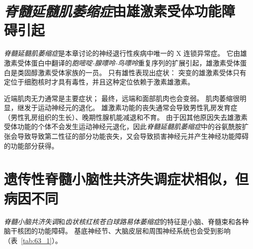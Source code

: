 \section{\textit{脊髓延髓肌萎缩症}由雄激素受体功能障碍引起}

\textit{脊髓延髓肌萎缩症}是本章讨论的神经退行性疾病中唯一的 X 连锁异常症。
它由雄激素受体蛋白中翻译的\textit{胞嘧啶-腺嘌呤-鸟嘌呤}重复序列的扩展引起，雄激素受体蛋白是类固醇激素受体家族的一员。
只有雄性表现出症状：
突变的雄激素受体只有定位于细胞核时才具有毒性，并且这种定位依赖于激素雄激素。


近端肌肉无力通常是主要症状；
最终，远端和面部肌肉也会变弱。
肌肉萎缩很明显，继发于运动神经元的退化。
雄激素功能的丧失通常会导致男性乳房发育症（男性乳房组织的生长）、晚期性腺机能减退和不育。
由于因其他原因失去雄激素受体功能的个体不会发生运动神经元退化，因此\textit{脊髓延髓肌萎缩症}中的谷氨酰胺扩张会导致导致第二性征的部分功能丧失，又会导致损害神经元并产生神经功能障碍的功能部分获得。



\section{遗传性脊髓小脑性共济失调症状相似，但病因不同}

\textit{脊髓小脑共济失调}和\textit{齿状核红核苍白球路易体萎缩症}的特征是小脑、脊髓束和各种脑干核团的功能障碍。
基底神经节、大脑皮层和周围神经系统也会受到影响（表~\ref{tab:63_1}）。


